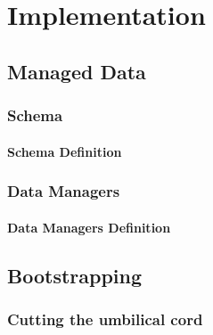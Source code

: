 \chapter{Implementation}\label{Implementation}

\section{Managed Data}\label{Managed Data Implementation}

\subsection{Schema}\label{Schema Implementation}

\subsubsection{Schema Definition}\label{Schema Definition}

\subsection{Data Managers}\label{Data Manager Implementation}

\subsubsection{Data Managers Definition}\label{Data Managers Definition}

\section{Bootstrapping}\label{Bootstrapping}

\subsection{Cutting the umbilical cord}\label{Cutting the umbilical cord}

